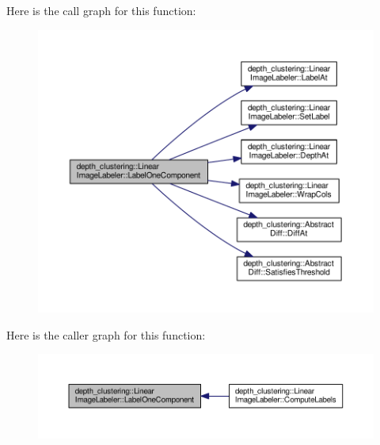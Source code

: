 Here is the call graph for this function\-:
\nopagebreak
\begin{figure}[H]
\begin{center}
\leavevmode
\includegraphics[width=350pt]{classdepth__clustering_1_1LinearImageLabeler_ac5544f26628a05978a6a989ade6a1cd6_cgraph}
\end{center}
\end{figure}




Here is the caller graph for this function\-:
\nopagebreak
\begin{figure}[H]
\begin{center}
\leavevmode
\includegraphics[width=350pt]{classdepth__clustering_1_1LinearImageLabeler_ac5544f26628a05978a6a989ade6a1cd6_icgraph}
\end{center}
\end{figure}


